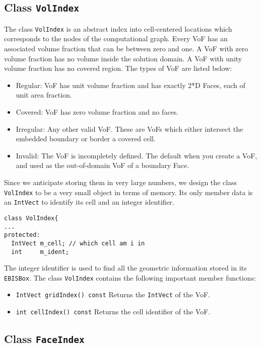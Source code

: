 \subsection{Class {\tt VolIndex}}
\label{sec::volindex}

The class {\tt VolIndex} is an abstract index into cell-centered locations
which corresponds to the nodes of the computational graph.  
Every VoF has an associated volume fraction that can be
between zero and one.  A VoF with zero volume fraction has no 
volume inside the solution domain.  A VoF
with unity volume fraction has no covered region.
The types of VoF are listed below:
\begin{itemize}
\item Regular: VoF has unit volume fraction and
has exactly 2*D Faces, each of 
unit area fraction. 
\item Covered: VoF has zero volume fraction and no faces.
\item Irregular: Any other valid  VoF.   These are VoFs which
either intersect the embedded boundary or border a covered
cell.
\item Invalid: The VoF is incompletely defined.  The default when you create 
a  VoF, and used as the out-of-domain  VoF of a boundary Face.
\end{itemize}
Since we anticipate storing them in very large numbers,
we design the class {\tt VolIndex} to be a very small object
in terms of memory.   Its only member data is an 
{\tt IntVect} to identify its cell and an integer
identifier.  
\begin{small}
\begin{verbatim}
class VolIndex{
...
protected:
  IntVect m_cell; // which cell am i in
  int     m_ident;
\end{verbatim}
\end{small}
The integer identifier is used to find all the geometric 
information stored in its {\tt EBISBox}.
The class {\tt VolIndex} contains the following important member functions:
\begin{itemize}
\item {\verb/IntVect gridIndex() const/} 
Returns the {\tt IntVect} of the VoF.
\item {\verb/int cellIndex() const/} 
Returns the cell identifier of the VoF.
\end{itemize}

\subsection{Class {\tt FaceIndex}}

